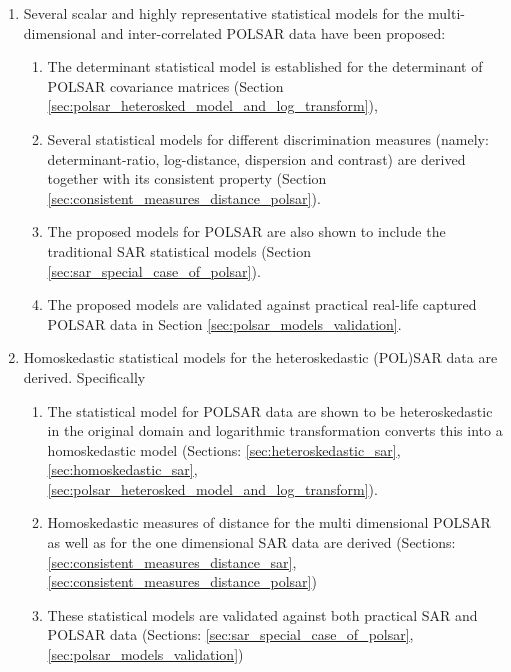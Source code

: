 \begin{enumerate}
\item           Several scalar and highly representative statistical models
                for the multi-dimensional and inter-correlated POLSAR
                data have been proposed:
                \begin{enumerate}
                \item The determinant statistical model is established for the determinant of POLSAR covariance matrices (Section \ref{sec:polsar_heterosked_model_and_log_transform}),
                \item Several statistical models for different discrimination measures (namely: determinant-ratio, log-distance, dispersion and contrast) are derived together with its consistent property (Section \ref{sec:consistent_measures_distance_polsar}). %
                \item The proposed models for POLSAR are also shown to include the traditional SAR statistical models (Section \ref{sec:sar_special_case_of_polsar}).
                \item The proposed models are validated against practical real-life
                captured POLSAR data in Section \ref{sec:polsar_models_validation}.
                \end{enumerate}
\item                Homoskedastic statistical models for the
                heteroskedastic (POL)SAR data are derived. Specifically 
                \begin{enumerate}
                \item The statistical model for POLSAR data are shown to be heteroskedastic in
                the original domain and logarithmic transformation
                converts this into a homoskedastic model (Sections: \ref{sec:heteroskedastic_sar}, \ref{sec:homoskedastic_sar}, \ref{sec:polsar_heterosked_model_and_log_transform}).
                \item Homoskedastic measures of distance for
                the multi dimensional POLSAR as well as for the one
                dimensional SAR data are derived (Sections: \ref{sec:consistent_measures_distance_sar}, \ref{sec:consistent_measures_distance_polsar})
                \item These statistical models are validated against both
                practical SAR and POLSAR data (Sections: \ref{sec:sar_special_case_of_polsar}, \ref{sec:polsar_models_validation})
                \end{enumerate}

\end{enumerate}
